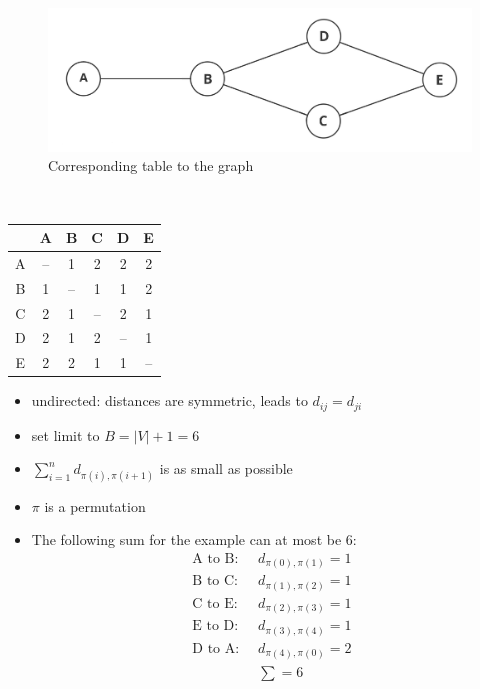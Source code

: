 \documentclass[a4]{scrartcl}
\begin{document}
\begin{minipage}{0.7\textwidth}
\begin{figure}[H]
\begin{center}
\includegraphics[scale=0.18]{tsp_1.png}
\end{center}
\caption{Corresponding table to the graph}
\end{figure}

\end{minipage}\begin{minipage}{0.05\textwidth}
\ \\
\end{minipage}\begin{minipage}{0.25\textwidth}
\begin{tabular}{c|c|c|c|c|c|}
 & A & B & C & D & E \\
\hline
A & -- & 1 & 2 & 2 & 2 \\
\hline
B & 1 & -- & 1 & 1 & 2 \\
\hline
C & 2 & 1 & -- & 2 & 1 \\
\hline
D & 2 & 1 & 2 & -- & 1 \\
\hline
E & 2 & 2 & 1 & 1 & -- \\
\hline
\end{tabular}


\end{minipage}

\begin{itemize}
\item undirected: distances are symmetric, leads to $d_{ij} = d_{ji}$
\item set limit to $B = |V|+1 = 6$
\item $\sum^{n}_{i=1} d_{\pi(i), \pi(i+1)}$ is as small as possible
\item $\pi$ is a permutation
\item[] The following sum for the example can at most be 6:
\begin{align*}
 \text{A to B: } & \  d_{\pi(0), \pi(1)} =  1 \\
  \text{B to C: } & \  d_{\pi(1), \pi(2)} = 1\\
   \text{C to E: } & \  d_{\pi(2), \pi(3)} = 1 \\
 \text{E to D: } & \  d_{\pi(3), \pi(4)} =  1\\
 \text{D to A: } & \  d_{\pi(4), \pi(0)} = 2
 \\
 & \ \sum = 6
\end{align*}

\end{itemize}
\end{document}
